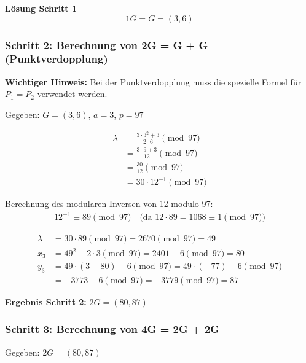 \documentclass{article}
\begin{document}
\begin{solutionbox}
\textbf{Lösung Schritt 1}
\begin{equation}
1G = G = (3, 6)
\end{equation}
\end{solutionbox}

\subsubsection{Schritt 2: Berechnung von 2G = G + G (Punktverdopplung)}

\begin{warningbox}
\textbf{Wichtiger Hinweis:} Bei der Punktverdopplung muss die spezielle Formel für $P_1 = P_2$ verwendet werden.
\end{warningbox}

Gegeben: $G = (3, 6)$, $a = 3$, $p = 97$

\begin{align}
\lambda &= \frac{3 \cdot 3^2 + 3}{2 \cdot 6} \pmod{97} \\
&= \frac{3 \cdot 9 + 3}{12} \pmod{97} \\
&= \frac{30}{12} \pmod{97} \\
&= 30 \cdot 12^{-1} \pmod{97}
\end{align}

Berechnung des modularen Inversen von 12 modulo 97:
\begin{align}
12^{-1} \equiv 89 \pmod{97} \quad \text{(da } 12 \cdot 89 = 1068 \equiv 1 \pmod{97}\text{)}
\end{align}

\begin{align}
\lambda &= 30 \cdot 89 \pmod{97} = 2670 \pmod{97} = 49 \\
x_3 &= 49^2 - 2 \cdot 3 \pmod{97} = 2401 - 6 \pmod{97} = 80 \\
y_3 &= 49 \cdot (3 - 80) - 6 \pmod{97} = 49 \cdot (-77) - 6 \pmod{97} \\
&= -3773 - 6 \pmod{97} = -3779 \pmod{97} = 87
\end{align}

\begin{solutionbox}
\textbf{Ergebnis Schritt 2:} $2G = (80, 87)$
\end{solutionbox}

\subsubsection{Schritt 3: Berechnung von 4G = 2G + 2G}
Gegeben: $2G = (80, 87)$
\end{document}
